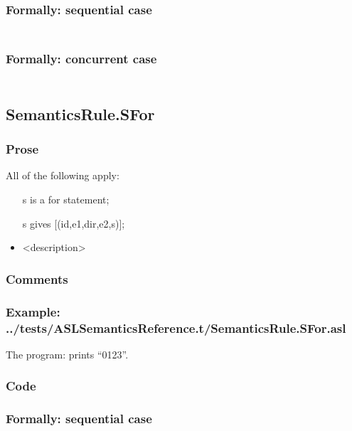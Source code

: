 \documentclass{book}
\begin{document}
  \subsubsection{Formally: sequential case}
  \begin{align}
  \end{align} 

  \subsubsection{Formally: concurrent case}
  \begin{align}
  \end{align} 

\subsection{SemanticsRule.SFor \label{sec:SemanticsRule.SFor}}

    \subsubsection{Prose}
    All of the following apply:
    \begin{itemize}
    \item [s] is a for statement;
    \item [s] gives [(id,e1,dir,e2,s)];
    \item <description>
    \end{itemize}

    \subsubsection{Comments}

    \subsubsection{Example: ../tests/ASLSemanticsReference.t/SemanticsRule.SFor.asl}
    The program:
    prints ``0123''.

  \subsubsection{Code}

  \subsubsection{Formally: sequential case}
  \begin{align}
  \end{align} 
\end{document}
